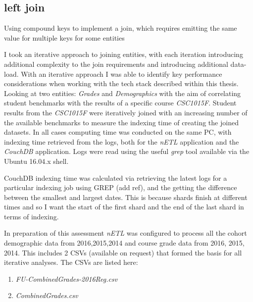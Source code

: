 \subsection{left join}
Using compound keys to implement a join, which requires emitting the same value for multiple keys for some entities








I took an iterative approach to joining entities, with each iteration introducing additional complexity to the join requirements and introducing additional data-load. With an iterative approach I was able to identify key performance considerations when working with the tech stack described within this thesis. Looking at two entities: \textit{Grades} and \textit{Demographics} with the aim of correlating student benchmarks with the results of a specific course \textit{CSC1015F}. Student results from the \textit{CSC1015F} were iteratively joined with an increasing number of the available benchmarks to measure the indexing time of creating the joined datasets. In all cases computing time was conducted on the same PC, with indexing time retrieved from the logs, both for the \textit{nETL} application and the \textit{CouchDB} application. Logs were read using the useful \textit{grep} tool available via the Ubuntu 16.04.x shell.

CouchDB indexing time was calculated via retrieving the latest logs for a particular indexing job using GREP (add ref), and the getting the difference between the smallest and largest dates. This is because shards finish at different times and so I want the start of the first shard and the end of the last shard in terms of indexing.

In preparation of this assessment \textit{nETL} was configured to process all the cohort demographic data from 2016,2015,2014 and course grade data from 2016, 2015, 2014. This includes 2 CSVs (available on request) that formed the basis for all iterative analyses. The CSVs are listed here:

\begin{enumerate}
    \item \textit{FU-CombinedGrades-2016Reg.csv}
    \item \textit{CombinedGrades.csv}
\end{enumerate}




